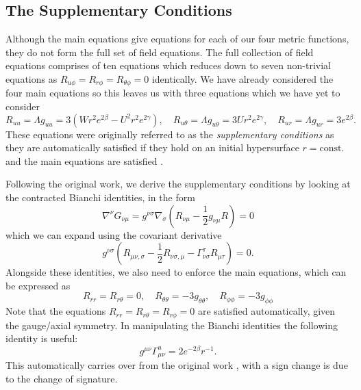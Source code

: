 \documentclass[a4paper,11pt]{article}
\numberwithin{equation}{section}
\begin{document}
\subsection{The Supplementary Conditions} \label{subsec: SC}
Although the main equations give equations for each of our four metric functions, they do not form the full set of field equations. The full collection of field equations comprises of ten equations which reduces down to seven non-trivial equations as $R_{u \phi}=R_{r \phi}=R_{\theta \phi}=0$ identically. We have already considered the four main equations so this leaves us with three equations which we have yet to consider
\begin{equation}
R_{uu}=\Lambda g_{uu}=3(Wr^2e^{2\beta}-U^2r^2e^{2\gamma}) , \quad R_{u\theta}=\Lambda g_{u \theta}=3Ur^2e^{2\gamma}, \quad R_{u r}=\Lambda g_{u r}=3 e^{2\beta}.
\end{equation} 
These equations were originally referred to as the {\it supplementary conditions} as they are automatically satisfied if they hold on an initial hypersurface $r=\text{const.}$ and the main equations are satisfied \cite{Sachs:1962wk}. 

Following the original work, we derive the supplementary conditions by looking at the contracted Bianchi identities, in the form
\begin{equation}
\nabla^{\nu}G_{\nu \mu}=g^{\nu \sigma}\nabla_{\sigma }\left(R_{\nu \mu}-\frac{1}{2}g_{\nu \mu}R\right)=0
\end{equation}
which we can expand using the covariant derivative
\begin{equation}
g^{\nu \sigma} \left(R_{\mu \nu, \sigma}-\frac{1}{2} R_{\nu \sigma, \mu} -\Gamma^{\tau}_{\nu \sigma} R_{\mu \tau}\right)=0.
\end{equation} 
Alongside these identities, we also need to enforce the main equations, which can be expressed as 
\begin{equation}
R_{rr}=R_{r \theta}=0, \quad R_{\theta \theta}=-3 g_{\theta \theta}, \quad R_{\phi \phi}=-3 g_{\phi \phi}
\end{equation}
Note that the equations $R_{r r}=R_{r \theta}=R_{r \phi}=0$ are satisfied automatically, given the gauge/axial symmetry. In manipulating the Bianchi identities the following identity is useful: 
\begin{equation} \label{eq: Christoffel_Identity}
g^{\mu \nu} \Gamma^{u}_{\mu \nu}= 2e^{-2\beta} r^{-1}.
\end{equation}
This automatically carries over from the original work \cite{Bondi:1962px}, with a sign change is due to the change of signature.
\end{document}
